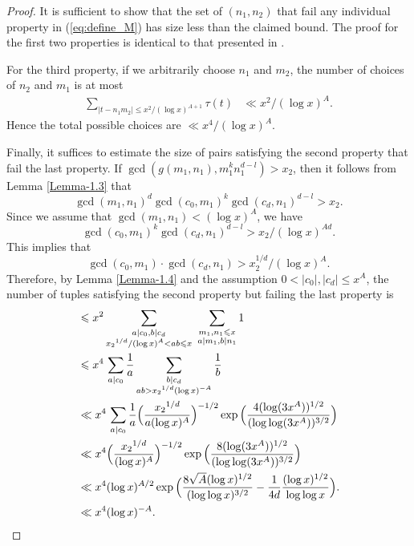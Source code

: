\documentclass[reqno, 11pt]{amsart}
\renewcommand{\leq}{\leqslant}
\theoremstyle{definition}
\theoremstyle{definition}
\renewcommand{\leq}{\leqslant}
\numberwithin{equation}{section}
\begin{document}
\begin{proof}
	It is sufficient to show that the set of $(n_1, n_2)$ that fail any individual property in (\ref{eq:define_M}) has size less than the claimed bound. The proof for the first two properties is identical to that presented in \cite[Lemma 2.7]{BST}.

    For the third property, if we arbitrarily choose $n_1$ and $m_2$, the number of choices of $n_2$ and $m_1$ is at most
    \begin{align*}
        \sum_{|t - n_1m_2| \leq x^2/(\log x)^{A+1}} \tau(t) & \ll x^2 / (\log x)^A. 
    \end{align*}
    Hence the total possible choices are $\ll x^4 / (\log x)^A.$
    
    Finally, it suffices to estimate the size of pairs satisfying the second property that fail the last property. If $\gcd(g(m_1,n_1), m_1^k n_1^{d-l}) > x_2$, then it follows from Lemma \ref{Lemma-1.3} that 
    $$\gcd(m_1,n_1)^d \gcd(c_0, m_1)^k \gcd(c_d, n_1)^{d-l} > x_2.$$
    Since we assume that $\gcd(m_1, n_1) < (\log x)^A$, we have
    $$\gcd(c_0, m_1)^k \gcd(c_d, n_1)^{d-l} > x_2 / (\log x)^{Ad}.$$
    This implies that
    $$\gcd(c_0, m_1) \cdot \gcd(c_d, n_1) > x_2^{1/d} / (\log x)^{A}.$$
    Therefore, by Lemma \ref{Lemma-1.4} and the assumption $0 < |c_0|, |c_d| \leq x^A$, the number of tuples satisfying the second property but failing the last property is
    \begin{align*}
       & \leq x^2 \sum_{\substack{a | c_0, b | c_d \\ {x_2}^{1/d} / (\log x)^{A} < a b \leq x}} \ \sum_{\substack{m_1, n_1 \leq x \\ a | m_1, b | n_1}} 1 \\
       & \leq  x^4 \, \sum_{a | c_0} \frac{1}{a} \sum_{\substack{b | c_d \\ a b > {x_2}^{1/d}(\log x)^{-A}}} \frac{1}{b} \\
       & \ll x^4 \, \sum_{a | c_0} \frac{1}{a} \Big( \frac{{x_2}^{1/d}}{a (\log x)^A} \Big)^{-1/2} \exp \Big( \frac{4(\log (3 x^A))^{1/2}}{(\log \log (3 x^A))^{3/2}} \Big) \\
       & \ll x^4 \Big( \frac{{x_2}^{1/d}}{(\log x)^A} \Big)^{-1/2} \exp \Big( \frac{8(\log (3 x^A))^{1/2}}{(\log \log (3 x^A))^{3/2}} \Big) 
       \\
       & \ll x^4 (\log x)^{A/2} \exp \Big( \frac{8 \sqrt{A}(\log x)^{1/2}}{(\log \log x)^{3/2}}  - \frac{1}{4d} \frac{(\log x)^{1/2}}{\log \log x}\Big).\\
       & \ll x^4 (\log x)^{-A}.\qedhere
    \end{align*}
\end{proof}
\end{document}
